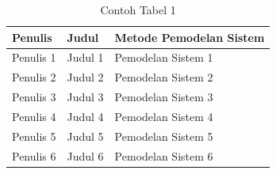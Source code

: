 \begin{table}[H]
    \centering
    \caption{Contoh Tabel 1}
    \label{t risetPemodelan}
    \begin{tabularx}{\linewidth}{
        |p{}%
        |p{}%
        |p{}|%
    }
        \hline
        Penulis & Judul & Metode Pemodelan Sistem\\ \hline
        Penulis 1 & Judul 1 & Pemodelan Sistem 1 \\ \hline
        Penulis 2 & Judul 2 & Pemodelan Sistem 2 \\ \hline
        Penulis 3 & Judul 3 & Pemodelan Sistem 3 \\ \hline
        Penulis 4 & Judul 4 & Pemodelan Sistem 4 \\ \hline
        Penulis 5 & Judul 5 & Pemodelan Sistem 5 \\ \hline
        Penulis 6 & Judul 6 & Pemodelan Sistem 6 \\ \hline
    \end{tabularx}
\end{table}